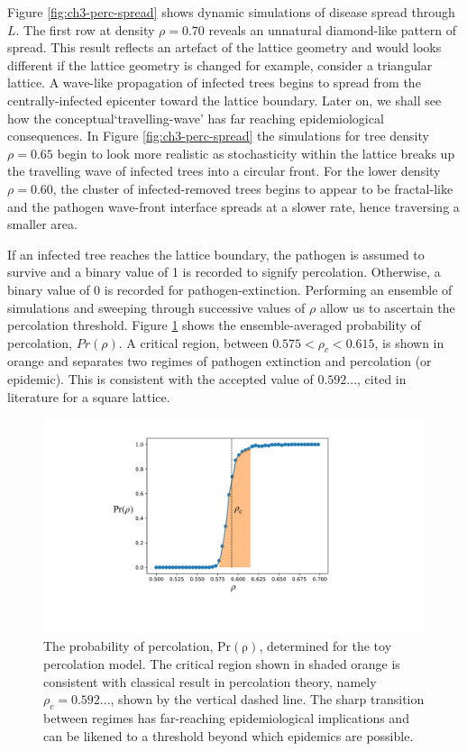 Figure \ref{fig:ch3-perc-spread} shows dynamic simulations of disease spread through $L$. %
The first row at density $\rho=0.70$ reveals an unnatural diamond-like pattern of spread. %
This result reflects an artefact of the lattice geometry and would looks different if the lattice geometry is changed \textemdash for example, consider a triangular lattice. %
A wave-like propagation of infected trees begins to spread from the centrally-infected epicenter toward the lattice boundary. %
Later on, we shall see how the conceptual`travelling-wave' has far reaching epidemiological consequences. %
In Figure \ref{fig:ch3-perc-spread} the simulations for tree density $\rho=0.65$ begin to %
look more realistic as stochasticity within the lattice breaks up the travelling wave of infected trees into a circular front. %
For the lower density $\rho = 0.60$, the cluster of infected-removed trees begins to appear %
to be fractal-like and the pathogen wave-front interface spreads at a slower rate, %
hence traversing a smaller area. %

If an infected tree reaches the lattice boundary, the pathogen is assumed to survive and a binary value of 1 is recorded to signify percolation. %
Otherwise, a binary value of 0 is recorded for pathogen-extinction. %
Performing an ensemble of simulations and sweeping through successive values of $\rho$ allow us to ascertain the percolation threshold. %
Figure \ref{fig:ch3-perc-pr} shows the ensemble-averaged probability of percolation, $Pr(\rho)$. A critical region, between $ 0.575 < \rho_c < 0.615$, is shown in orange and separates two regimes of pathogen extinction and percolation (or epidemic). %
This is consistent with the accepted value of $0.592...$, cited in literature for a square lattice. %
 
\begin{figure}
    \centering
    \includegraphics[scale=0.25]{chapter3/figures/figure2.pdf}
    \caption{The probability of percolation, $\mathrm{Pr(\rho)}$, determined for the toy percolation model. The critical region shown in shaded orange is consistent with classical result in percolation theory, namely $\rho_c = 0.592...$, shown by the vertical dashed line. The sharp transition between regimes has far-reaching epidemiological implications and can be likened to a threshold beyond which epidemics are possible.}
    \label{fig:ch3-perc-pr}
\end{figure}

